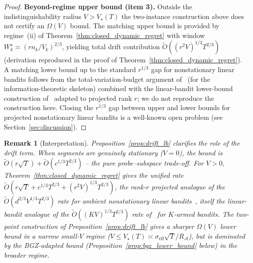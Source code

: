 \documentclass[11pt]{article}
\newcommand{\cA}{\mathcal{A}}
\newtheorem{remark}{Remark}
\begin{document}
\begin{proof}
\textbf{Beyond-regime upper bound (item 3).}
Outside the indistinguishability radius $V>V_\star(T)$ the two-instance
construction above does not certify an $\Omega(V)$ bound.  The matching upper
bound is provided by regime~(ii) of Theorem~\ref{thm:closed_dynamic_regret}
with window $W_k^\star\asymp(rn_k/V_k)^{2/3}$, yielding total drift
contribution $\widetilde O((r^2V)^{1/3}T^{2/3})$ (derivation reproduced in the
proof of Theorem~\ref{thm:closed_dynamic_regret}).  A matching lower bound up
to the standard $r^{1/3}$ gap for nonstationary linear bandits follows from
the total-variation-budget argument of~\citet{besbes2014stochastic} (for the
information-theoretic skeleton) combined with the linear-bandit lower-bound
construction of~\citet{cheung2019learning} adapted to projected rank $r$; we
do not reproduce the construction here.  Closing the $r^{1/3}$ gap between
upper and lower bounds for projected nonstationary linear bandits is a
well-known open problem (see Section~\ref{sec:discussion}).
\end{proof}

\begin{remark}[Interpretation]
\label{rem:drift_regime}
Proposition~\ref{prop:drift_lb} clarifies the role of the drift term.
When segments are genuinely stationary ($V=0$), the bound is
$\widetilde{O}(r\sqrt T)+\widetilde{O}(c^{1/3}T^{2/3})$ -- the pure
probe--subspace trade-off.  For $V>0$, Theorem~\ref{thm:closed_dynamic_regret}
gives the unified rate $\widetilde O(r\sqrt T+c^{1/3}T^{2/3}+(r^2V)^{1/3}T^{2/3})$,
the rank-$r$ projected analogue of the
$\widetilde O(d^{2/3}V^{1/3}T^{2/3})$ rate for ambient nonstationary linear
bandits~\citep{russac2019weighted,cheung2019learning}, itself the
linear-bandit analogue of the $\widetilde O((KV)^{1/3}T^{2/3})$ rate
of~\citet{besbes2014stochastic} for $K$-armed bandits.  The two-point
construction of Proposition~\ref{prop:drift_lb} gives a sharper
$\Omega(V)$ lower bound in a narrow small-$V$ regime
($V\le V_\star(T)\asymp\sigma_{\mathrm{eff}}\sqrt T/R_\cA$), but is
dominated by the BGZ-adapted bound (Proposition~\ref{prop:bgz_lower_bound}
below) in the broader regime.
\end{remark}
\end{document}
